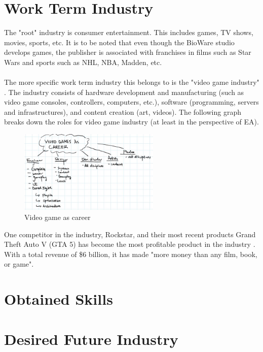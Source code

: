 \documentclass[10pt,letterpaper]{article}
\begin{document}
\section{Work Term Industry}\label{work-term-industry}

The "root" industry is consumer entertainment. This includes games, TV shows, movies, sports, etc. It is to be noted that even though the BioWare studio develops games, the publisher is associated with franchises in films such as Star Wars and sports such as NHL, NBA, Madden, etc.\\
\\
The more specific work term industry this belongs to is the "video game industry" \cite{video-game-industry}. The industry consists of hardware development and manufacturing (such as video game consoles, controllers, computers, etc.), software (programming, servers and infrastructures), and content creation (art, videos). The following graph breaks down the roles for video game industry \cite{EA-intern-conf-2} (at least in the perspective of EA).

\begin{figure}[H]
\centering
\includegraphics[width=0.6\textwidth]{assets/video-games-career-roles}
\caption{Video game as career}
\end{figure}

One competitor in the industry, Rockstar, and their most recent products Grand Theft Auto V (GTA 5) has become the most profitable product in the industry \cite{IGN-gta5}. With a total revenue of \$6 billion, it has made "more money than any film, book, or game".

\section{Obtained Skills}\label{obtained-skills}



\section{Desired Future Industry}\label{desired-future-industry}
\end{document}
